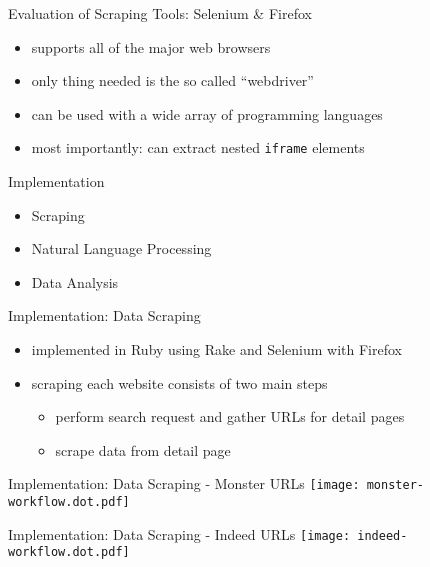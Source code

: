 \documentclass[aspectratio=169]{beamer}
\begin{document}
  \begin{frame}{Evaluation of Scraping Tools: Selenium \& Firefox}
    \begin{itemize}
      \item supports all of the major web browsers
      \item only thing needed is the so called “webdriver”
      \item can be used with a wide array of programming languages
      \item most importantly: can extract nested \texttt{iframe} elements
    \end{itemize}
  \end{frame}

  \begin{frame}{Implementation}
    \begin{itemize}
      \item Scraping
      \item Natural Language Processing
      \item Data Analysis
    \end{itemize}
  \end{frame}

  \begin{frame}{Implementation: Data Scraping}
    \begin{itemize}
      \item implemented in Ruby using Rake and Selenium with Firefox
      \item scraping each website consists of two main steps
        \begin{itemize}
          \item perform search request and gather URLs for detail pages
          \item scrape data from detail page
        \end{itemize}
    \end{itemize}
  \end{frame}

  \begin{frame}{Implementation: Data Scraping - Monster URLs}
    \centering
    \texttt{[image: monster-workflow.dot.pdf]}
  \end{frame}

  \begin{frame}{Implementation: Data Scraping - Indeed URLs}
    \centering
    \texttt{[image: indeed-workflow.dot.pdf]}
  \end{frame}
\end{document}
